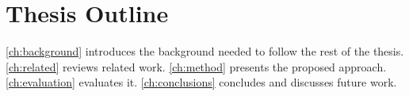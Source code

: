 \section{Thesis Outline}\label{sec:outline}
\autoref{ch:background} introduces the background needed to follow the rest of the thesis.
\autoref{ch:related} reviews related work.
\autoref{ch:method} presents the proposed approach.
\autoref{ch:evaluation} evaluates it.
\autoref{ch:conclusions} concludes and discusses future work.
